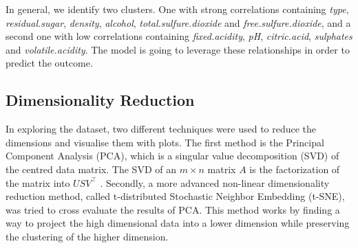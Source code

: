 \documentclass[11pt,twoside]{article}
\numberwithin{Theorem}{section}
\numberwithin{Definition}{section}
\numberwithin{Lemma}{section}
\numberwithin{Algorithm}{section}
\numberwithin{equation}{section}
\begin{document}
In general, we identify two clusters. One with strong correlations containing \textit{type}, \textit{residual.sugar}, \textit{density}, \textit{alcohol}, \textit{total.sulfure.dioxide} and \textit{free.sulfure.dioxide}, and a second one with low correlations containing \textit{fixed.acidity}, \textit{pH}, \textit{citric.acid}, \textit{sulphates} and \textit{volatile.acidity}. The model is going to leverage these relationships in order to predict the outcome.
\subsection{Dimensionality Reduction}
\label{sec:reduction}
In exploring the dataset, two different techniques were used to reduce the dimensions and visualise them with plots. The first method is the Principal Component Analysis (PCA), which is a singular value decomposition (SVD) of the centred data matrix. The SVD of an $ m \times n $ matrix $A$ is the factorization of the matrix into $USV^\top$ \cite{dme}. Secondly, a more advanced non-linear dimensionality reduction method, called t-distributed Stochastic Neighbor Embedding (t-SNE), was tried to cross evaluate the results of PCA. This method works by finding a way to project the high dimensional data into a lower dimension while preserving the clustering of the higher dimension.
\end{document}
